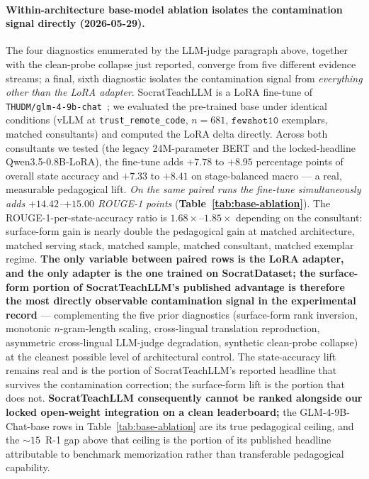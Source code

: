 \documentclass[11pt]{article}
\begin{document}
\paragraph{Within-architecture base-model ablation isolates the contamination signal directly (2026-05-29).} The four diagnostics enumerated by the LLM-judge paragraph above, together with the clean-probe collapse just reported, converge from five different evidence streams; a final, sixth diagnostic isolates the contamination signal from \emph{everything other than the LoRA adapter}. SocratTeachLLM is a LoRA fine-tune of \texttt{THUDM/glm-4-9b-chat}~\citep{glm2024chatglm}; we evaluated the pre-trained base under identical conditions (vLLM at \texttt{trust\_remote\_code}, $n{=}681$, $\mathtt{fewshot10}$ exemplars, matched consultants) and computed the LoRA delta directly. Across both consultants we tested (the legacy 24M-parameter BERT and the locked-headline Qwen3.5-0.8B-LoRA), the fine-tune adds $\boldsymbol{+7.78}$ to $\boldsymbol{+8.95}$ percentage points of overall state accuracy and $\boldsymbol{+7.33}$ to $\boldsymbol{+8.41}$ on stage-balanced macro --- a real, measurable pedagogical lift. \emph{On the same paired runs the fine-tune simultaneously adds $\boldsymbol{+14.42}$--$\boldsymbol{+15.00}$ ROUGE-1 points} (\textbf{Table~\ref{tab:base-ablation}}). The ROUGE-1-per-state-accuracy ratio is $\mathbf{1.68}\times$--$\mathbf{1.85}\times$ depending on the consultant: surface-form gain is nearly double the pedagogical gain at matched architecture, matched serving stack, matched sample, matched consultant, matched exemplar regime. \textbf{The only variable between paired rows is the LoRA adapter, and the only adapter is the one trained on SocratDataset; the surface-form portion of SocratTeachLLM's published advantage is therefore the most directly observable contamination signal in the experimental record} --- complementing the five prior diagnostics (surface-form rank inversion, monotonic $n$-gram-length scaling, cross-lingual translation reproduction, asymmetric cross-lingual LLM-judge degradation, synthetic clean-probe collapse) at the cleanest possible level of architectural control. The state-accuracy lift remains real and is the portion of SocratTeachLLM's reported headline that survives the contamination correction; the surface-form lift is the portion that does not. \textbf{SocratTeachLLM consequently cannot be ranked alongside our locked open-weight integration on a clean leaderboard;} the GLM-4-9B-Chat-base rows in Table~\ref{tab:base-ablation} are its true pedagogical ceiling, and the $\sim$$15$~R-1 gap above that ceiling is the portion of its published headline attributable to benchmark memorization rather than transferable pedagogical capability.
\end{document}
